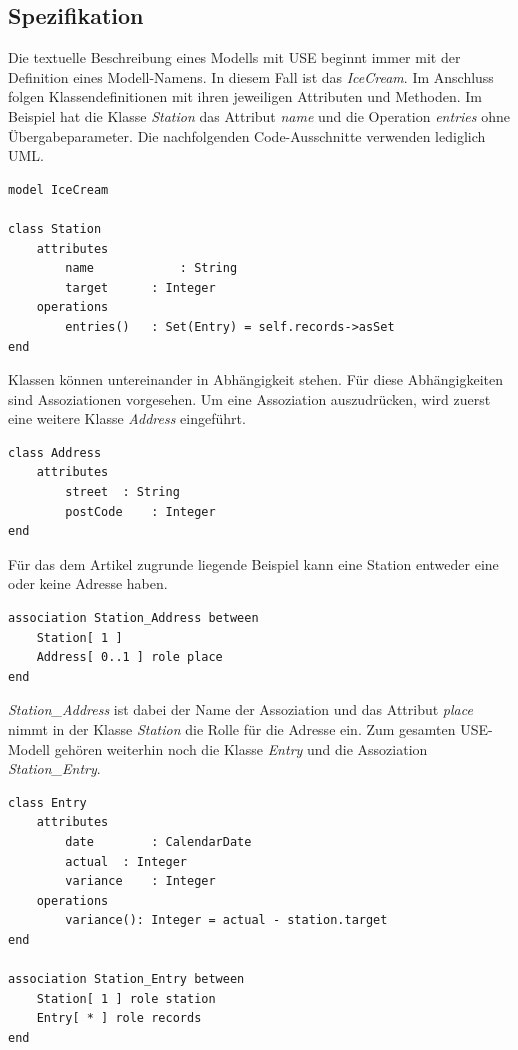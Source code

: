 \documentclass[a4paper,twoside]{article}
\begin{document}
\subsection{Spezifikation} 
\label{ssec:specification}

Die textuelle Beschreibung eines Modells mit USE beginnt immer mit der Definition eines Modell-Namens. In diesem Fall ist das \textit{IceCream}. Im Anschluss folgen Klassendefinitionen mit ihren jeweiligen Attributen und Methoden. Im Beispiel hat die Klasse \textit{Station} das Attribut \textit{name} und die Operation \textit{entries} ohne Übergabeparameter. Die nachfolgenden Code-Ausschnitte verwenden lediglich UML.

\lstset{basicstyle=\tiny,style=myCustomUseStyle}
\begin{lstlisting}
model IceCream

class Station
	attributes
		name			: String
		target		: Integer
	operations
		entries()	: Set(Entry) = self.records->asSet
end
\end{lstlisting}

Klassen können untereinander in Abhängigkeit stehen. Für diese Abhängigkeiten sind Assoziationen vorgesehen. Um eine Assoziation auszudrücken, wird zuerst eine weitere Klasse \textit{Address} eingeführt.

\begin{lstlisting}
class Address
	attributes
		street	: String
		postCode	: Integer
end
\end{lstlisting}

Für das dem Artikel zugrunde liegende Beispiel kann eine Station entweder eine oder keine Adresse haben.

\begin{lstlisting}
association Station_Address between
	Station[ 1 ] 
	Address[ 0..1 ] role place
end
\end{lstlisting}

\textit{Station\_Address} ist dabei der Name der Assoziation und das Attribut \textit{place} nimmt in der Klasse \textit{Station} die Rolle für die Adresse ein. Zum gesamten USE-Modell gehören weiterhin noch die Klasse \textit{Entry} und die Assoziation \textit{Station\_Entry}.

\begin{lstlisting}
class Entry
	attributes
		date		: CalendarDate
		actual	: Integer
		variance	: Integer
	operations
		variance(): Integer = actual - station.target	
end

association Station_Entry between
	Station[ 1 ] role station
	Entry[ * ] role records
end
\end{lstlisting}
\end{document}

